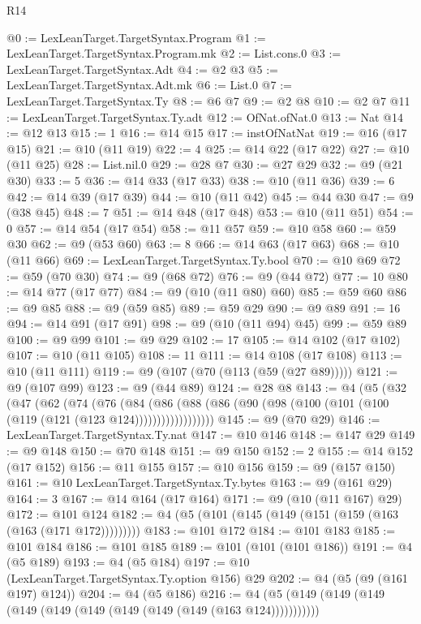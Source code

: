 \begin{lexlean}{R14}
\begin{coremodule}
@0 := LexLeanTarget.TargetSyntax.Program
@1 := LexLeanTarget.TargetSyntax.Program.mk
@2 := List.cons.{0}
@3 := LexLeanTarget.TargetSyntax.Adt
@4 := @2 @3
@5 := LexLeanTarget.TargetSyntax.Adt.mk
@6 := List.{0}
@7 := LexLeanTarget.TargetSyntax.Ty
@8 := @6 @7
@9 := @2 @8
@10 := @2 @7
@11 := LexLeanTarget.TargetSyntax.Ty.adt
@12 := OfNat.ofNat.{0}
@13 := Nat
@14 := @12 @13
@15 := 1
@16 := @14 @15
@17 := instOfNatNat
@19 := @16 (@17 @15)
@21 := @10 (@11 @19)
@22 := 4
@25 := @14 @22 (@17 @22)
@27 := @10 (@11 @25)
@28 := List.nil.{0}
@29 := @28 @7
@30 := @27 @29
@32 := @9 (@21 @30)
@33 := 5
@36 := @14 @33 (@17 @33)
@38 := @10 (@11 @36)
@39 := 6
@42 := @14 @39 (@17 @39)
@44 := @10 (@11 @42)
@45 := @44 @30
@47 := @9 (@38 @45)
@48 := 7
@51 := @14 @48 (@17 @48)
@53 := @10 (@11 @51)
@54 := 0
@57 := @14 @54 (@17 @54)
@58 := @11 @57
@59 := @10 @58
@60 := @59 @30
@62 := @9 (@53 @60)
@63 := 8
@66 := @14 @63 (@17 @63)
@68 := @10 (@11 @66)
@69 := LexLeanTarget.TargetSyntax.Ty.bool
@70 := @10 @69
@72 := @59 (@70 @30)
@74 := @9 (@68 @72)
@76 := @9 (@44 @72)
@77 := 10
@80 := @14 @77 (@17 @77)
@84 := @9 (@10 (@11 @80) @60)
@85 := @59 @60
@86 := @9 @85
@88 := @9 (@59 @85)
@89 := @59 @29
@90 := @9 @89
@91 := 16
@94 := @14 @91 (@17 @91)
@98 := @9 (@10 (@11 @94) @45)
@99 := @59 @89
@100 := @9 @99
@101 := @9 @29
@102 := 17
@105 := @14 @102 (@17 @102)
@107 := @10 (@11 @105)
@108 := 11
@111 := @14 @108 (@17 @108)
@113 := @10 (@11 @111)
@119 := @9 (@107 (@70 (@113 (@59 (@27 @89)))))
@121 := @9 (@107 @99)
@123 := @9 (@44 @89)
@124 := @28 @8
@143 := @4
    (@5
      (@32
        (@47
          (@62
            (@74
              (@76
                (@84
                  (@86
                    (@88 (@86 (@90 (@98 (@100 (@101 (@100 (@119 (@121 (@123 @124))))))))))))))))))
@145 := @9 (@70 @29)
@146 := LexLeanTarget.TargetSyntax.Ty.nat
@147 := @10 @146
@148 := @147 @29
@149 := @9 @148
@150 := @70 @148
@151 := @9 @150
@152 := 2
@155 := @14 @152 (@17 @152)
@156 := @11 @155
@157 := @10 @156
@159 := @9 (@157 @150)
@161 := @10 LexLeanTarget.TargetSyntax.Ty.bytes
@163 := @9 (@161 @29)
@164 := 3
@167 := @14 @164 (@17 @164)
@171 := @9 (@10 (@11 @167) @29)
@172 := @101 @124
@182 := @4 (@5 (@101 (@145 (@149 (@151 (@159 (@163 (@163 (@171 @172)))))))))
@183 := @101 @172
@184 := @101 @183
@185 := @101 @184
@186 := @101 @185
@189 := @101 (@101 (@101 @186))
@191 := @4 (@5 @189)
@193 := @4 (@5 @184)
@197 := @10 (LexLeanTarget.TargetSyntax.Ty.option @156) @29
@202 := @4 (@5 (@9 (@161 @197) @124))
@204 := @4 (@5 @186)
@216 := @4 (@5 (@149 (@149 (@149 (@149 (@149 (@149 (@149 (@149 (@149 (@163 @124)))))))))))

\end{coremodule}
\end{lexlean}
